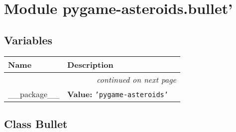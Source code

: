 %
%
%


\section{Module pygame-asteroids.bullet'}

    \label{pygame-asteroids:bullet'}


  \subsection{Variables}

    \vspace{-1cm}
\hspace{\varindent}\begin{longtable}{|p{\varnamewidth}|p{\vardescrwidth}|l}
\cline{1-2}
\cline{1-2} \centering \textbf{Name} & \centering \textbf{Description}& \\
\cline{1-2}
\endhead\cline{1-2}\multicolumn{3}{r}{\small\textit{continued on next page}}\\\endfoot\cline{1-2}
\endlastfoot\raggedright \_\-\_\-p\-a\-c\-k\-a\-g\-e\-\_\-\_\- & \raggedright \textbf{Value:} 
{\tt \texttt{'}\texttt{pygame-asteroids}\texttt{'}}&\\
\cline{1-2}
\end{longtable}



\subsection{Class Bullet}

